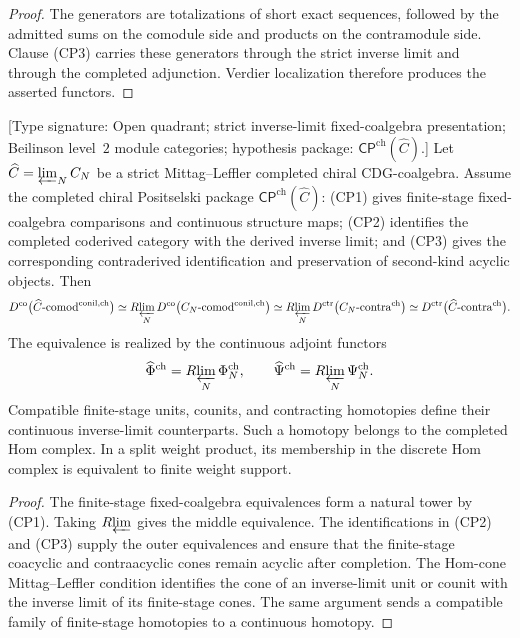 \begin{proof}
The generators are totalizations of short exact sequences, followed
by the admitted sums on the comodule side and products on the
contramodule side.  Clause \textup{(CP3)} carries these generators
through the strict inverse limit and through the completed adjunction.
Verdier localization therefore produces the asserted functors.
\end{proof}

\begin{theorem}
\label{thm:chiral-positselski-weight-completed}
\label{thm:chiral-positselski-7-2}%
\label{thm:chiral-positselski-5-3}%
\textup{[Type signature: Open quadrant; strict inverse-limit
fixed-coalgebra presentation; Beilinson level~\(2\) module
categories; hypothesis package:
\(\mathsf{CP}^{\mathrm{ch}}(\widehat C)\).]}
Let
\(\widehat C=\varprojlim_NC_N\) be a strict Mittag--Leffler completed
chiral CDG-coalgebra.  Assume the completed chiral Positselski package
\(\mathsf{CP}^{\mathrm{ch}}(\widehat C)\):
\textup{(CP1)} gives finite-stage fixed-coalgebra comparisons and
continuous structure maps; \textup{(CP2)} identifies the completed
coderived category with the derived inverse limit; and
\textup{(CP3)} gives the corresponding contraderived identification
and preservation of second-kind acyclic objects.  Then
\begin{equation}\label{eq:chiral-positselski-weight-completed}
D^{\mathrm{co}}\bigl(\widehat C\text{-}
 \mathrm{comod}^{\mathrm{conil,ch}}\bigr)
\simeq
R\!\varprojlim_N
D^{\mathrm{co}}\bigl(C_N\text{-}
 \mathrm{comod}^{\mathrm{conil,ch}}\bigr)
\simeq
R\!\varprojlim_N
D^{\mathrm{ctr}}\bigl(C_N\text{-}
 \mathrm{contra}^{\mathrm{ch}}\bigr)
\simeq
D^{\mathrm{ctr}}\bigl(\widehat C\text{-}
 \mathrm{contra}^{\mathrm{ch}}\bigr).
\end{equation}
The equivalence is realized by the continuous adjoint functors
\[
 \widehat\Phi^{\mathrm{ch}}
 =R\!\varprojlim_N\Phi_N^{\mathrm{ch}},
 \qquad
 \widehat\Psi^{\mathrm{ch}}
 =R\!\varprojlim_N\Psi_N^{\mathrm{ch}}.
\]
Compatible finite-stage units, counits, and contracting homotopies
define their continuous inverse-limit counterparts.  Such a homotopy
belongs to the completed Hom complex.  In a split weight product, its
membership in the discrete Hom complex is equivalent to finite weight
support.
\end{theorem}

\begin{proof}
The finite-stage fixed-coalgebra equivalences form a natural tower by
\textup{(CP1)}.  Taking \(R\!\varprojlim\) gives the middle
equivalence.  The identifications in \textup{(CP2)} and
\textup{(CP3)} supply the outer equivalences and ensure that the
finite-stage coacyclic and contraacyclic cones remain acyclic after
completion.  The Hom-cone Mittag--Leffler condition identifies the
cone of an inverse-limit unit or counit with the inverse limit of its
finite-stage cones.  The same argument sends a compatible family of
finite-stage homotopies to a continuous homotopy.
\end{proof}

